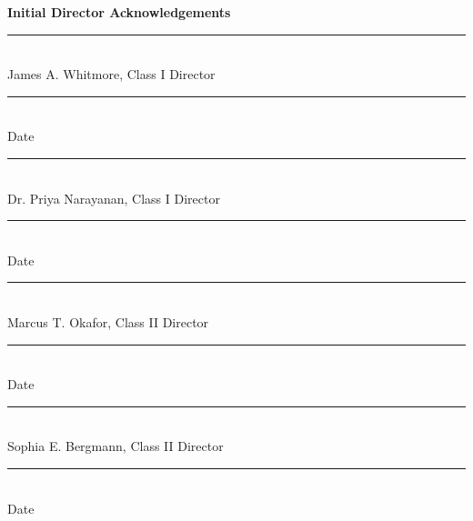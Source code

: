 \documentclass[12pt,a4paper]{scrartcl}
\begin{document}
\vspace{16pt}

\noindent\textbf{\color{NavyDeep}Initial Director Acknowledgements}


\vspace{12pt}

\noindent\begin{minipage}[t]{0.48\linewidth}
\begin{tcolorbox}[signbox]
  \vspace{4pt}
  \rule{\linewidth}{0.4pt}\\[-2pt]
  {\small\color{SlateGray}James A. Whitmore, Class I Director}\\[14pt]
  \rule{\linewidth}{0.4pt}\\[-2pt]
  {\small\color{SlateGray}Date}
\end{tcolorbox}
\end{minipage}%
\hfill%
\begin{minipage}[t]{0.48\linewidth}
\begin{tcolorbox}[signbox]
  \vspace{4pt}
  \rule{\linewidth}{0.4pt}\\[-2pt]
  {\small\color{SlateGray}Dr. Priya Narayanan, Class I Director}\\[14pt]
  \rule{\linewidth}{0.4pt}\\[-2pt]
  {\small\color{SlateGray}Date}
\end{tcolorbox}
\end{minipage}

\par
\vspace{10pt}

\noindent\begin{minipage}[t]{0.48\linewidth}
\begin{tcolorbox}[signbox]
  \vspace{4pt}
  \rule{\linewidth}{0.4pt}\\[-2pt]
  {\small\color{SlateGray}Marcus T. Okafor, Class II Director}\\[14pt]
  \rule{\linewidth}{0.4pt}\\[-2pt]
  {\small\color{SlateGray}Date}
\end{tcolorbox}
\end{minipage}%
\hfill%
\begin{minipage}[t]{0.48\linewidth}
\begin{tcolorbox}[signbox]
  \vspace{4pt}
  \rule{\linewidth}{0.4pt}\\[-2pt]
  {\small\color{SlateGray}Sophia E. Bergmann, Class II Director}\\[14pt]
  \rule{\linewidth}{0.4pt}\\[-2pt]
  {\small\color{SlateGray}Date}
\end{tcolorbox}
\end{minipage}
\end{document}
